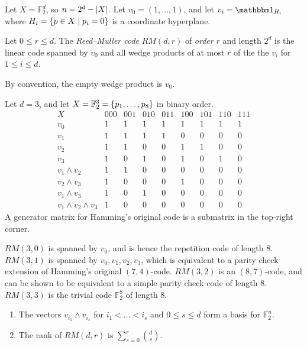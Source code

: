 Let \( X = \mathbb F_2^d \), so \( n = 2^d - \abs{X} \).
Let \( v_0 = (1, \dots, 1) \), and let \( v_i = \mathbbm 1_{H_i} \) where \( H_i = \qty{p \in X \mid p_i = 0} \) is a coordinate hyperplane.
\begin{definition}
    Let \( 0 \leq r \leq d \).
    The \emph{Reed--Muller code} \( RM(d,r) \) of \emph{order} \( r \) and length \( 2^d \) is the linear code spanned by \( v_0 \) and all wedge products of at most \( r \) of the the \( v_i \) for \( 1 \leq i \leq d \).
\end{definition}
By convention, the empty wedge product is \( v_0 \).
\begin{example}
    Let \( d = 3 \), and let \( X = \mathbb F_2^3 = \qty{p_1, \dots, p_8} \) in binary order.
    \[ \begin{array}{c|cccccccc}
        X & 000 & 001 & 010 & 011 & 100 & 101 & 110 & 111 \\\hline
        v_0 & 1 & 1 & 1 & 1 & 1 & 1 & 1 & 1 \\
        v_1 & 1 & 1 & 1 & 1 & 0 & 0 & 0 & 0 \\
        v_2 & 1 & 1 & 0 & 0 & 1 & 1 & 0 & 0 \\
        v_3 & 1 & 0 & 1 & 0 & 1 & 0 & 1 & 0 \\
        v_1 \wedge v_2 & 1 & 1 & 0 & 0 & 0 & 0 & 0 & 0 \\
        v_2 \wedge v_3 & 1 & 0 & 0 & 0 & 1 & 0 & 0 & 0 \\
        v_1 \wedge v_3 & 1 & 0 & 1 & 0 & 0 & 0 & 0 & 0 \\
        v_1 \wedge v_2 \wedge v_3 & 1 & 0 & 0 & 0 & 0 & 0 & 0 & 0
    \end{array} \]
    A generator matrix for Hamming's original code is a submatrix in the top-right corner.
\end{example}
\( RM(3,0) \) is spanned by \( v_0 \), and is hence the repetition code of length 8.
\( RM(3,1) \) is spanned by \( v_0, v_1, v_2, v_3 \), which is equivalent to a parity check extension of Hamming's original \( (7,4) \)-code.
\( RM(3,2) \) is an \( (8,7) \)-code, and can be shown to be equivalent to a simple parity check code of length 8.
\( RM(3,3) \) is the trivial code \( \mathbb F_2^8 \) of length 8.
\begin{theorem}
    \begin{enumerate}
        \item The vectors \( v_{i_1} \wedge v_{i_s} \) for \( i_1 < \dots < i_s \) and \( 0 \leq s \leq d \) form a basis for \( \mathbb F_2^n \).
        \item The rank of \( RM(d,r) \) is \( \sum_{s=0}^r \binom{d}{s} \). 
    \end{enumerate}
\end{theorem}
